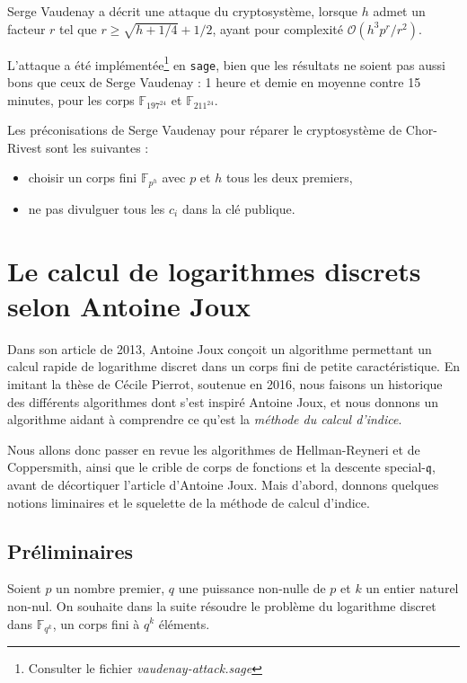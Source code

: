 \documentclass[a4paper, titlepage, 11pt]{article}
\theoremstyle{definition}
\theoremstyle{remark}
\def\O{\mathcal O}
\def\gf #1{\mathbb{F}_{#1}}
\begin{document}
Serge Vaudenay a décrit une attaque du cryptosystème, lorsque $h$ admet un facteur $r$ tel que $r \geqslant \sqrt{h + 1/4} + 1/2$, ayant pour complexité $\O(h^3p^r/r^2)$.

L'attaque a été implémentée\footnote{Consulter le fichier \textit{vaudenay-attack.sage}} en \verb|sage|, bien que les résultats ne soient pas aussi bons que ceux de Serge Vaudenay : 1 heure et demie en moyenne contre 15 minutes, pour les corps $\gf{197^{24}}$ et $\gf{211^{24}}$.

Les préconisations de Serge Vaudenay pour réparer le cryptosystème de Chor-Rivest sont les suivantes : \begin{itemize}
\item choisir un corps fini $\gf{p^h}$ avec $p$ et $h$ tous les deux premiers,
\item ne pas divulguer tous les $c_i$ dans la clé publique.
\end{itemize}

\section{Le calcul de logarithmes discrets selon Antoine Joux}\label{sec:DLPJoux}


Dans son article \cite{joux2013} de 2013, Antoine Joux conçoit un algorithme permettant un calcul rapide de logarithme discret dans un corps fini de petite caractéristique. En imitant la thèse \cite{pierrot2016} de Cécile Pierrot, soutenue en 2016, nous faisons un historique des différents algorithmes dont s'est inspiré Antoine Joux, et nous donnons un algorithme aidant à comprendre ce qu'est la \textit{méthode du calcul d'indice}.

Nous allons donc passer en revue les algorithmes de Hellman-Reyneri et de Coppersmith, ainsi que le crible de corps de fonctions et la descente special-$\mathfrak{q}$, avant de décortiquer l'article \cite{joux2013} d'Antoine Joux. Mais d’abord, donnons quelques notions liminaires et le squelette de la méthode de calcul d’indice.

\subsection{Préliminaires}

Soient $p$ un nombre premier, $q$ une puissance non-nulle de $p$ et $k$ un entier naturel non-nul. On souhaite dans la suite résoudre le problème du logarithme discret dans $\gf{q^k}$, un corps fini à $q^k$ éléments.
\end{document}
